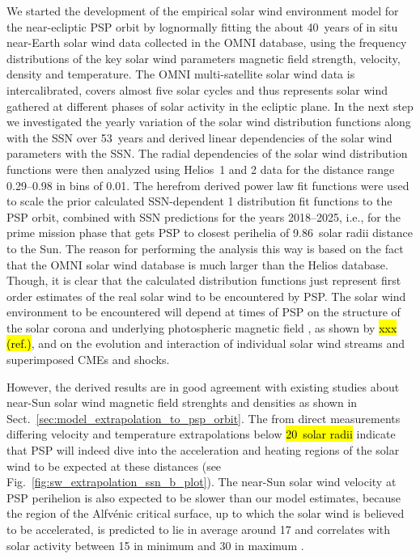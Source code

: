 We started the development of the empirical solar wind environment model for the near-ecliptic PSP orbit by lognormally fitting the about 40~years of in situ near-Earth solar wind data collected in the OMNI database, using the frequency distributions of the key solar wind parameters magnetic field strength, velocity, density and temperature. The OMNI multi-satellite solar wind data is intercalibrated, covers almost five solar cycles and thus represents solar wind gathered at different phases of solar activity in the ecliptic plane. In the next step we investigated the yearly variation of the solar wind distribution functions along with the SSN over 53~years and derived linear dependencies of the solar wind parameters with the SSN. The radial dependencies of the solar wind distribution functions were then analyzed using Helios~1 and 2 data for the distance range \SIrange{0.29}{0.98}{\au} in bins of \SI{0.01}{\au}. The herefrom derived power law fit functions were used to scale the prior calculated SSN-dependent \SI{1}{\au} distribution fit functions to the PSP orbit, combined with SSN predictions for the years 2018--2025, i.e., for the prime mission phase that gets PSP to closest perihelia of 9.86~solar radii distance to the Sun. The reason for performing the analysis this way is based on the fact that the OMNI solar wind database is much larger than the Helios database. Though, it is clear that the calculated distribution functions just represent first order estimates of the real solar wind to be encountered by PSP. The solar wind environment to be encountered will depend at times of PSP on the structure of the solar corona and underlying photospheric magnetic field {\color{red} , as shown by \hl{xxx (ref.)},} and on the evolution and interaction of individual solar wind streams and superimposed CMEs and shocks.

However, the derived results are in good agreement with existing studies about near-Sun solar wind magnetic field strenghts and densities as shown in Sect.~\ref{sec:model_extrapolation_to_psp_orbit}. The from direct measurements differing velocity and temperature extrapolations below \hl{20~solar radii} indicate that PSP will indeed dive into the acceleration and heating regions of the solar wind to be expected at these distances (see Fig.~\ref{fig:sw_extrapolation_ssn_b_plot}). The near-Sun solar wind velocity at PSP perihelion is also expected to be slower than our model estimates, because the region of the Alfvénic critical surface, up to which the solar wind is believed to be accelerated, is predicted to lie in average around \SI{17}{\Rs} \citep[e.g.,][]{Sittler1999,Exarhos2000} and correlates with solar activity between \SI{15}{\Rs} in minimum and \SI{30}{\Rs} in maximum \citep{Katsikas2010,Goelzer2014}.	%


